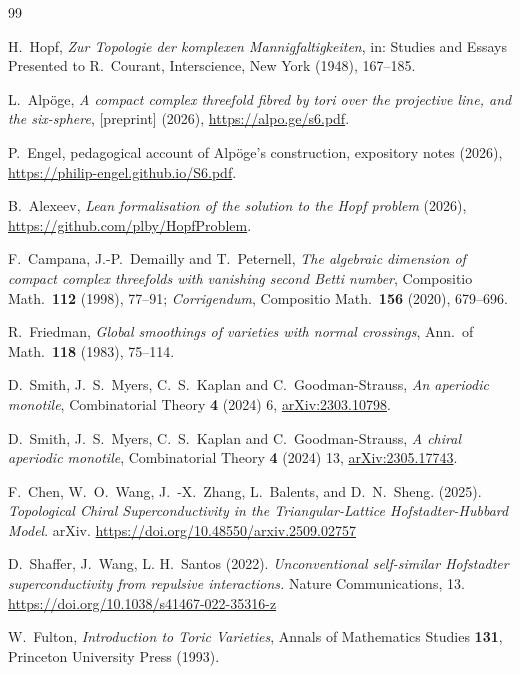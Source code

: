 \documentclass[11pt,a4paper]{article}
\theoremstyle{plain}
\theoremstyle{definition}
\begin{document}
\begin{thebibliography}{99}

H.~Hopf,
\emph{Zur Topologie der komplexen Mannigfaltigkeiten},
in: Studies and Essays Presented to R.~Courant, Interscience, New York
(1948), 167--185.

L.~Alpöge,
\emph{A compact complex threefold fibred by tori over the projective line,
and the six-sphere},
[preprint] (2026), \url{https://alpo.ge/s6.pdf}.

P.~Engel,
pedagogical account of Alpöge's construction, expository notes (2026),
\newline
\url{https://philip-engel.github.io/S6.pdf}.

B.~Alexeev,
\emph{Lean formalisation of the solution to the Hopf problem} (2026),
\newline
\url{https://github.com/plby/HopfProblem}.

F.~Campana, J.-P.~Demailly and T.~Peternell,
\emph{The algebraic dimension of compact complex threefolds with vanishing
second Betti number}, Compositio Math.\ \textbf{112} (1998), 77--91;
\emph{Corrigendum}, Compositio Math.\ \textbf{156} (2020), 679--696.

R.~Friedman,
\emph{Global smoothings of varieties with normal crossings},
Ann.\ of Math.\ \textbf{118} (1983), 75--114.

D.~Smith, J.~S.~Myers, C.~S.~Kaplan and C.~Goodman-Strauss,
\emph{An aperiodic monotile},
Combinatorial Theory \textbf{4} (2024) 6,
\href{https://arxiv.org/abs/2303.10798}{arXiv:2303.10798}.

D.~Smith, J.~S.~Myers, C.~S.~Kaplan and C.~Goodman-Strauss,
\emph{A chiral aperiodic monotile},
Combinatorial Theory \textbf{4} (2024) 13,
\href{https://arxiv.org/abs/2305.17743}{arXiv:2305.17743}.

F.~Chen, W.~O.~Wang, J.~-X.~Zhang, L.~Balents, and D.~N.~Sheng. (2025). 
\emph{Topological Chiral Superconductivity in the Triangular-Lattice Hofstadter-Hubbard Model}. arXiv.
\url{https://doi.org/10.48550/arxiv.2509.02757}

D.~Shaffer, J.~Wang, L. H.~Santos (2022). 
\emph{Unconventional self-similar Hofstadter superconductivity from repulsive interactions.}
Nature Communications, 13. 
\url{https://doi.org/10.1038/s41467-022-35316-z}

W.~Fulton,
\emph{Introduction to Toric Varieties},
Annals of Mathematics Studies \textbf{131}, Princeton University Press (1993).


\end{thebibliography}
\end{document}
